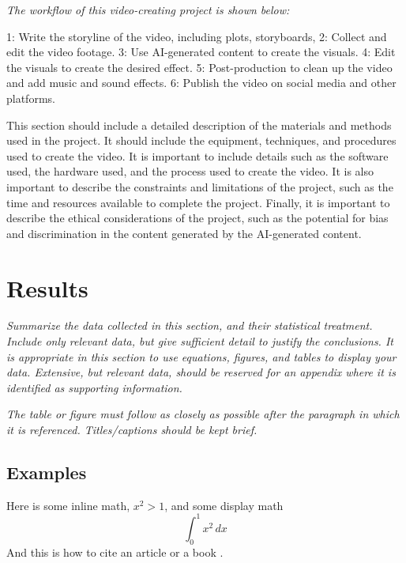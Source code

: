 \documentclass[11pt,a4paper,oneside]{report}
\newcommand{\instructions}[1]{{\color{black}\itshape #1}}
\begin{document}
\instructions{The workflow of this video-creating project is shown below:

1: Write the storyline of the video, including plots, storyboards, 
2: Collect and edit the video footage.
3: Use AI-generated content to create the visuals.
4: Edit the visuals to create the desired effect.
5: Post-production to clean up the video and add music and sound effects.
6: Publish the video on social media and other platforms.

This section should include a detailed description of the materials and
methods used in the project. It should include the equipment, techniques,
and procedures used to create the video. It is important to include
details such as the software used, the hardware used, and the process
used to create the video. It is also important to describe the
constraints and limitations of the project, such as the time and
resources available to complete the project. Finally, it is important
to describe the ethical considerations of the project, such as the
potential for bias and discrimination in the content generated by the
AI-generated content.
}


\chapter{Results}
\label{results}

\instructions{Summarize the data collected in this section, and their
statistical treatment. Include only relevant data, but give sufficient
detail to justify the conclusions. It is appropriate in this section to
use equations, figures, and tables to display your data. Extensive, but
relevant data, should be reserved for an appendix where it is identified
as supporting information.}

\instructions{The table or figure must follow as closely as possible after the
paragraph in which it is referenced. Titles/captions should be kept
brief.}

\section{Examples}

Here is some inline math, $x^2 > 1$, and some display math
\begin{equation}
  \int_0^1 x^2 \, dx
\end{equation}
And this is how to cite an article \cite{Zhang2021} or a book \cite{Axler2020}.
\end{document}

